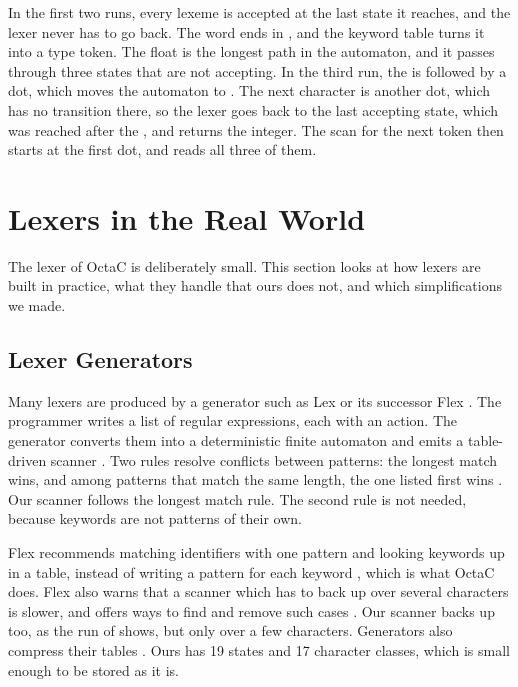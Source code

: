 \medskip
\noindent In the first two runs, every lexeme is accepted at the last state it reaches,
and the lexer never has to go back. The word  ends in ,
and the keyword table turns it into a type token. The float  is
the longest path in the automaton, and it passes through three states that
are not accepting. In the third run, the  is followed by a dot, which
moves the automaton to . The next character is another dot, which
has no transition there, so the lexer goes back to the last accepting state,
which was reached after the , and returns the integer. The scan for the
next token then starts at the first dot, and reads all three of them.

\section{Lexers in the Real World}
\label{sec:lexers-real-world}

The lexer of OctaC is deliberately small. This section looks at how lexers
are built in practice, what they handle that ours does not, and which
simplifications we made.

\subsection{Lexer Generators}

Many lexers are produced by a generator such as Lex \cite{lesk1975lex} or its
successor Flex \cite{flex-manual}. The programmer writes a list of regular
expressions, each with an action. The generator converts them into a
deterministic finite automaton and emits a table-driven scanner
\cite{aho2006compilers}. Two rules resolve conflicts between patterns: the
longest match wins, and among patterns that match the same length, the one
listed first wins \cite{lesk1975lex,flex-manual}. Our scanner follows the
longest match rule. The second rule is not needed, because keywords are not
patterns of their own.

Flex recommends matching identifiers with one pattern and looking keywords up
in a table, instead of writing a pattern for each keyword
\cite{flex-manual}, which is what OctaC does. Flex also warns that a scanner
which has to back up over several characters is slower, and offers ways to
find and remove such cases \cite{flex-manual}. Our scanner backs up too, as the
run of  shows, but only over a few characters. Generators also
compress their tables \cite{aho2006compilers}. Ours has 19 states and 17
character classes, which is small enough to be stored as it is.

